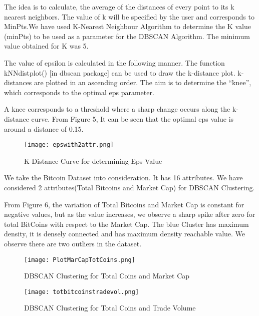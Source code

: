 \documentclass{article}
\begin{document}
The idea is to calculate, the average of the distances of every point to its k nearest neighbors. The value of k will be specified by the user and corresponds to MinPts.We have used K-Nearest Neighbour Algorithm to determine the K value (minPts) to be used as a parameter for the DBSCAN Algorithm. The minimum value obtained for K was 5. \newline

The value of epsilon is calculated in the following manner. The function kNNdistplot() [in dbscan package] can be used to draw the k-distance plot. k-distances are plotted in an ascending order. The aim is to determine the “knee”, which corresponds to the optimal eps parameter. \newline

A knee corresponds to a threshold where a sharp change occurs along the k-distance curve. From Figure 5, It can be seen that the optimal eps value is around a distance of 0.15.


\begin{figure}[h]
    \centering
    \texttt{[image: epswith2attr.png]}
    \caption{K-Distance Curve for determining Eps Value }
    \label{fig:my_label}
\end{figure}

We take the Bitcoin Dataset into consideration. It has 16 attributes. We have considered 2 attributes(Total Bitcoins and Market Cap) for DBSCAN Clustering.\newline

From Figure 6, the variation of Total Bitcoins and Market Cap is constant for negative values, but as the value increases, we observe a sharp spike after zero for total BitCoins with respect to the Market Cap. The blue Cluster has maximum density, it is densely connected and has maximum density reachable value. We observe there are two outliers in the dataset. \newline

\begin{figure}[h]
    \centering
    \texttt{[image: PlotMarCapTotCoins.png]}
    \caption{DBSCAN Clustering for Total Coins and Market Cap }
    \label{fig:my_label}
\end{figure}


\begin{figure}[h]
    \centering
    \texttt{[image: totbitcoinstradevol.png]}
    \caption{DBSCAN Clustering for Total Coins and Trade Volume }
    \label{fig:my_label}
\end{figure}
\end{document}
